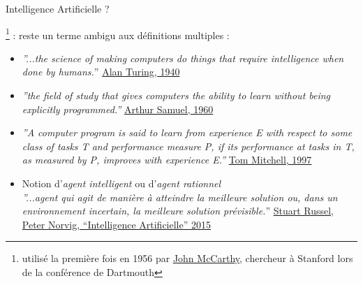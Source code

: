\documentclass[10pt,serif,mathserif,compress,hyperref={colorlinks}]{beamer}
\begin{document}
\begin{frame}{Intelligence Artificielle ?}

  \footnote{{\tiny utilisé la première fois en 1956 par \href{https://en.wikipedia.org/wiki/John\_McCarthy\_\%28computer\_scientist\%29}{John McCarthy},
      chercheur à Stanford lors de la conférence de Dartmouth}} :
  reste un terme ambigu aux définitions multiples :

  \begin{itemize}

  \item <2-> {\em ''...the science of making computers do things that require intelligence when done by humans.}''
    {\tiny \href{http://www.alanturing.net/turing\_archive/pages/reference\%20articles/what\%20is\%20ai.html}{Alan Turing, 1940}}\\[3mm]    

  \item <2-> {\em ''the field of study that gives computers the ability to learn without being explicitly programmed.''}
        {\tiny  \href{http://infolab.stanford.edu/pub/voy/museum/samuel.html}{Arthur Samuel, 1960}}

  \item <2-> {\em ''A computer program is said to learn from experience E with respect to some class of tasks T and performance measure P,
    if its performance at tasks in T, as measured by P, improves with experience E.''}
    {\tiny \href{https://www.cs.cmu.edu/~tom/}{Tom Mitchell, 1997}}

  \item <2-> Notion d'{\em agent intelligent} ou d'{\em agent rationnel}\\
    {\em ''...agent qui agit de manière à
    atteindre la meilleure solution ou, dans un environnement incertain, la meilleure solution prévisible.}''
    {\tiny  \hyperlink{refRusselNorvig}{Stuart Russel, Peter Norvig, ``Intelligence Artificielle'' 2015}}

  \end{itemize}

\end{frame}
\end{document}
